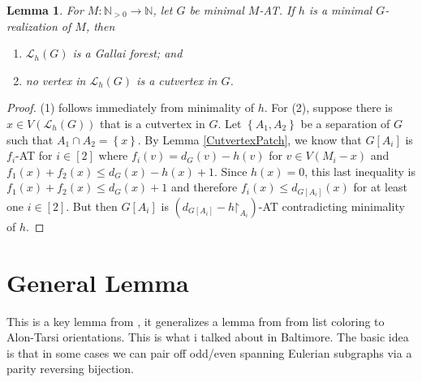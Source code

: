 \documentclass[12pt]{article}
\theoremstyle{plain}
\newtheorem{lem}[thm]{Lemma}
\theoremstyle{definition}
\theoremstyle{remark}
\newcommand{\fancy}[1]{\mathcal{#1}}
\newcommand{\IN}{\mathbb{N}}
\newcommand{\set}[1]{\left\{ #1 \right\}}
\newcommand{\func}[3]{#1\colon #2 \rightarrow #3}
\newcommand{\irange}[1]{\left[#1\right]}
\def\L{\fancy{L}}
\renewcommand{\restriction}{\mathord{\upharpoonright}}
\begin{document}
\begin{lem}\label{NoLowCutvertices}
	For $\func{M}{\IN_{>0}}{\IN}$, let $G$ be minimal $M$-AT. If $h$ is a minimal $G$-realization of $M$, then
	\begin{enumerate}
		\item $\L_h(G)$ is a Gallai forest; and
		\item no vertex in $\L_h(G)$ is a cutvertex in $G$.
	\end{enumerate}
\end{lem}
\begin{proof}
	(1) follows immediately from minimality of $h$.  For (2), suppose there is $x \in V(\L_h(G))$ that is a cutvertex in $G$.  Let $\set{A_1, A_2}$ be a separation of $G$ such that $A_1 \cap A_2 = \set{x}$.  By Lemma \ref{CutvertexPatch}, we know that $G[A_i]$ is $f_i$-AT for $i \in \irange{2}$ where $f_i(v) = d_G(v) - h(v)$ for $v \in V(M_i-x)$ and $f_1(x) + f_2(x) \le d_G(x) - h(x) + 1$.  Since $h(x) = 0$, this last inequality is $f_1(x) + f_2(x) \le d_G(x) + 1$ and therefore $f_i(x) \le d_{G[A_i]}(x)$ for at least one $i \in \irange{2}$.  But then $G[A_i]$ is $(d_{G[A_i]} - h\restriction_{A_i})$-AT contradicting minimality of $h$.
\end{proof}

\section{General Lemma}
This is a key lemma from \cite{OreVizing}, it generalizes a lemma from \cite{kostochkastiebitzedgesincriticalgraph} from list coloring to Alon-Tarsi orientations.  
This is what i talked about in Baltimore.  The basic idea is that in some cases we can pair off odd/even spanning Eulerian subgraphs via a parity reversing bijection.
\end{document}
